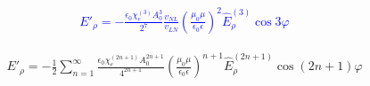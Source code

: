 \textcolor{blue} { \begin{equation*} \begin{aligned}
E'_\rho = - \frac{\epsilon_0 \chi_e^{(3)} A_0^3}{2^7}
\frac{v_{NL}}{v_{LN}}
\left( \frac{\mu_0 \mu}{\epsilon_0 \epsilon} \right)^2 
\hat{E}_\rho^{(3)} \cos 3 \varphi
\end{aligned} \end{equation*} }

\begin{equation*} \begin{aligned}
E'_\rho = - \frac{1}{2} \sum_{n=1}^{\infty} 
\frac{\epsilon_0 \chi_e^{(2n+1)} A_0^{2n+1} }{ 4^{2n+1} }
\left( \frac{\mu_0 \mu}{\epsilon_0 \epsilon} \right)^{n+1}
\hat{E}_\rho^{(2n+1)} \cos (2n + 1) \varphi
\end{aligned} \end{equation*}

